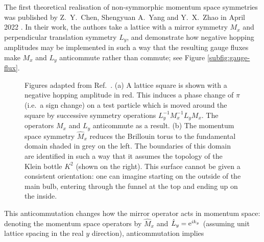 The first theoretical realisation of non-symmorphic momentum space symmetries was published by Z.~Y.~Chen, Shengyuan A.~Yang and Y.~X.~Zhao in April 2022 \cite{CYZ_Klein-gauge}. In their work, the authors take a lattice with a mirror symmetry $M_x$ and perpendicular translation symmetry $L_y$, and demonstrate how negative hopping amplitudes may be implemented in such a way that the resulting gauge fluxes make $M_x$ and $L_y$ anticommute rather than commute; see Figure \ref{subfig:gauge-flux}.
\begin{figure}[htb!]
	\centering
	\hfil
	\caption{Figures adapted from Ref.~\cite{CYZ_Klein-gauge}. (a) A lattice square is shown with a negative hopping amplitude in red. This induces a phase change of $\pi$ (i.e.\ a sign change) on a test particle which is moved around the square by successive symmetry operations $L_y^{-1}M_x^{-1}L_yM_x$. The operators $M_x$ and $L_y$ anticommute as a result. (b) The momentum space symmetry $\hat{M}_x$ reduces the Brillouin torus to the fundamental domain shaded in grey on the left. The boundaries of this domain are identified in such a way that it assumes the topology of the Klein bottle $K^2$ (shown on the right). This surface cannot be given a consistent orientation: one can imagine starting on the outside of the main bulb, entering through the funnel at the top and ending up on the inside.}
	\label{fig:CYZ_Klein}
\end{figure}
This anticommutation changes how the mirror operator acts in momentum space: denoting the momentum space operators by $\hat{M}_x$ and $\hat{L}_y=\operatorname{e}^{ik_y}$ (assuming unit lattice spacing in the real $y$ direction), anticommutation implies
